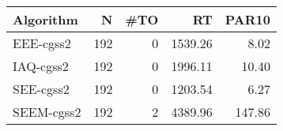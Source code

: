\begin{tabular}{lrrrr}
\toprule
 Algorithm &   N &  \#TO &      RT &  PAR10 \\
\midrule
 EEE-cgss2 & 192 &    0 & 1539.26 &   8.02 \\
 IAQ-cgss2 & 192 &    0 & 1996.11 &  10.40 \\
 SEE-cgss2 & 192 &    0 & 1203.54 &   6.27 \\
SEEM-cgss2 & 192 &    2 & 4389.96 & 147.86 \\
\bottomrule
\end{tabular}
